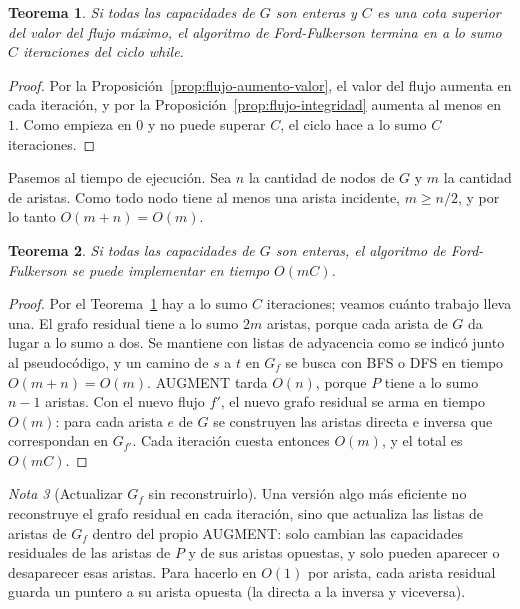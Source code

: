\documentclass[12pt, spanish, oneside, openany]{book}
\newcommand{\alg}[1]{#1}
\theoremstyle{uprightplain}
\newtheorem{teorema}{Teorema}[section]
\theoremstyle{definition}
\theoremstyle{remark}
\newtheorem{nota}[teorema]{Nota}
\theoremstyle{definition}
\begin{document}
\begin{teorema}
\label{teo:flujo-ff-termina}
Si todas las capacidades de $G$ son enteras y $C$ es una cota superior del valor del flujo máximo, el algoritmo de Ford-Fulkerson termina en a lo sumo $C$ iteraciones del ciclo while.
\end{teorema}
\begin{proof}
Por la Proposición~\ref{prop:flujo-aumento-valor}, el valor del flujo aumenta en cada iteración, y por la Proposición~\ref{prop:flujo-integridad} aumenta al menos en $1$. Como empieza en $0$ y no puede superar $C$, el ciclo hace a lo sumo $C$ iteraciones.
\end{proof}

Pasemos al tiempo de ejecución. Sea $n$ la cantidad de nodos de $G$ y $m$ la cantidad de aristas. Como todo nodo tiene al menos una arista incidente, $m\ge n/2$, y por lo tanto $O(m+n)=O(m)$.

\begin{teorema}
\label{teo:flujo-ff-tiempo}
Si todas las capacidades de $G$ son enteras, el algoritmo de Ford-Fulkerson se puede implementar en tiempo $O(mC)$.
\end{teorema}
\begin{proof}
Por el Teorema~\ref{teo:flujo-ff-termina} hay a lo sumo $C$ iteraciones; veamos cuánto trabajo lleva una. El grafo residual tiene a lo sumo $2m$ aristas, porque cada arista de $G$ da lugar a lo sumo a dos. Se mantiene con listas de adyacencia como se indicó junto al pseudocódigo, y un camino de $s$ a $t$ en $G_f$ se busca con BFS o DFS en tiempo $O(m+n)=O(m)$. \alg{AUGMENT} tarda $O(n)$, porque $P$ tiene a lo sumo $n-1$ aristas. Con el nuevo flujo $f'$, el nuevo grafo residual se arma en tiempo $O(m)$: para cada arista $e$ de $G$ se construyen las aristas directa e inversa que correspondan en $G_{f'}$. Cada iteración cuesta entonces $O(m)$, y el total es $O(mC)$.
\end{proof}

\begin{nota}[Actualizar $G_f$ sin reconstruirlo]
\label{nota:flujo-actualizar-residual}
Una versión algo más eficiente no reconstruye el grafo residual en cada iteración, sino que actualiza las listas de aristas de $G_f$ dentro del propio \alg{AUGMENT}: solo cambian las capacidades residuales de las aristas de $P$ y de sus aristas opuestas, y solo pueden aparecer o desaparecer esas aristas. Para hacerlo en $O(1)$ por arista, cada arista residual guarda un puntero a su arista opuesta (la directa a la inversa y viceversa).
\end{nota}
\end{document}
